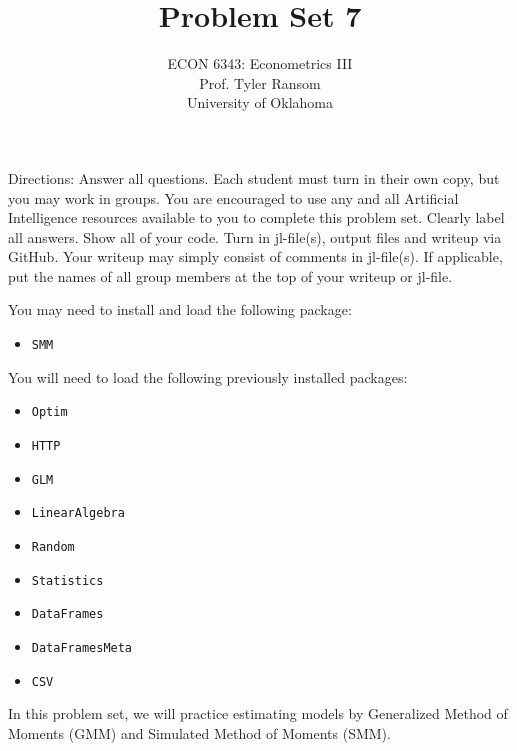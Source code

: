 \documentclass[12pt,english]{article}
\begin{document}
\title{Problem Set 7}
\author{ECON 6343: Econometrics III\\
Prof. Tyler Ransom\\
University of Oklahoma}
\date{}%

\maketitle
Directions: Answer all questions. Each student must turn in their own copy, but you may work in groups. You are encouraged to use any and all Artificial Intelligence resources available to you to complete this problem set. Clearly label all answers. Show all of your code. Turn in jl-file(s), output files and writeup via GitHub. Your writeup may simply consist of comments in jl-file(s). If applicable, put the names of all group members at the top of your writeup or jl-file.

You may need to install and load the following package:
\begin{itemize}
 \item[~] \texttt{SMM}
\end{itemize}

You will need to load the following previously installed packages:
\begin{itemize}
    \item[~] \texttt{Optim} 
    \item[~] \texttt{HTTP} 
    \item[~] \texttt{GLM} 
    \item[~] \texttt{LinearAlgebra} 
    \item[~] \texttt{Random} 
    \item[~] \texttt{Statistics} 
    \item[~] \texttt{DataFrames} 
    \item[~] \texttt{DataFramesMeta} 
    \item[~] \texttt{CSV} 
\end{itemize}
\pagebreak
In this problem set, we will practice estimating models by Generalized Method of Moments (GMM) and Simulated Method of Moments (SMM).
\end{document}
